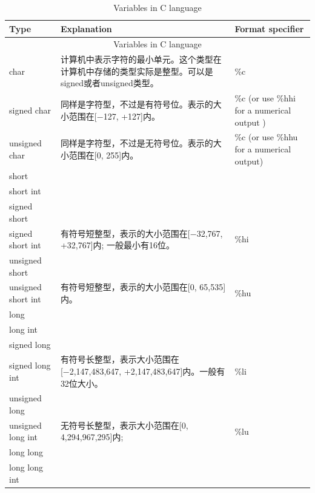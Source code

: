 \documentclass[10pt,a4paper]{article}
\begin{document}
	\begingroup 
	\setlength{\LTleft}{-20cm plus -1fill}
	\setlength{\LTright}{\LTleft}
	\begin{longtable}{| p{2cm} | p{8cm} | p{3cm} |}
		\caption{ Variables in C language }						\\
		\hline
		Type &  Explanation & Format specifier					\\
		\hline
		\endfirsthead
		\multicolumn{3}{c}{ Variables in C language }			\\

		\endhead
		\endfoot
		char 					& 计算机中表示字符的最小单元。这个类型在计算机中存储的类型实际是整型。可以是signed或者unsigned类型。 & \%c				   \\
		\hline
		signed char				& 同样是字符型，不过是有符号位。表示的大小范围在[−127, +127]内。 & \%c (or use \%hhi for a numerical output )			   \\
		\hline
		unsigned char 			& 同样是字符型，不过是无符号位。表示的大小范围在[0, 255]内。 & \%c (or use \%hhu for a numerical output)				   \\
		\hline
		short 					& &\multirow[|c|]{1}{8cm}{}		\\
		short int 				& &\multirow[|c|]{1}{8cm}{}		\\
		signed short 			& &\multirow[|c|]{1}{8cm}{}		\\
		signed short int 		& \multirow[|c|]{-4}{8cm}{ 有符号短整型，表示的大小范围在[−32,767, +32,767]内; 一般最小有16位。} & \%hi 				   \\
	    \hline
		unsigned short 			& &\multirow[|c|]{1}{8cm}{}		\\
		unsigned short int 		& \multirow{-2}{8cm}{ 有符号短整型，表示的大小范围在[0, 65,535]内。} & \%hu 											   \\
		\hline
		long 					& &\multirow[|c|]{1}{8cm}{}		\\
		long int 				&&\multirow[|c|]{1}{8cm}{}		\\
		signed long  			&	&\multirow[|c|]{1}{8cm}{}	\\
		signed long int 		& \multirow{-4}{8cm}{有符号长整型，表示大小范围在[−2,147,483,647, +2,147,483,647]内。一般有32位大小。} & \%li 			   \\
		\hline
		unsigned long 			& &\multirow[|c|]{1}{8cm}{}		\\
		unsigned long int 		& \multirow{-2}{8cm}{无符号长整型，表示大小范围在[0, 4,294,967,295]内;} & \%lu 										       \\
		\hline
		long long 				& &\multirow[|c|]{1}{8cm}{}		\\
		long long int 			& &\multirow[|c|]{1}{8cm}{}		\\

\end{longtable}
\end{document}

